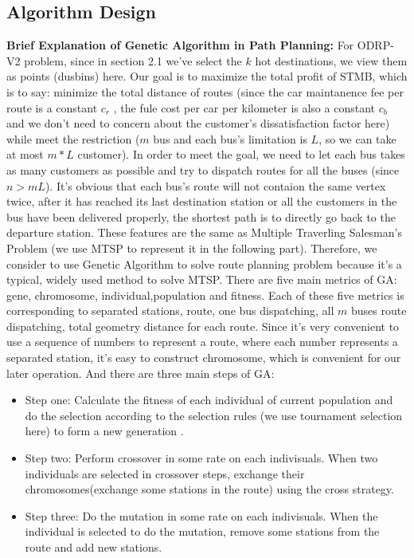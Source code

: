 \documentclass{llncs}
\begin{document}
\subsection{Algorithm Design}
\textbf{Brief Explanation of Genetic Algorithm in Path Planning:} For ODRP-V2 problem, since in section 2.1 we've select the $k$ hot destinations, we view them as points (dusbins) here. Our goal is to maximize the total profit of STMB, which is to say: minimize the total distance of routes (since the car maintanence fee per route is a constant $c_r$ , the fule cost per car per kilometer is also a constant $c_b$ and we don't need to concern about the customer's dissatisfaction factor here) while meet the restriction ($m$ bus and each bus's limitation is $L$, so we can take at most $m*L$ customer). In order to meet the goal, we need to let each bus takes as many customers as possible and try to dispatch routes for all the buses (since $n>mL$). It's obvious that each bus's route will not contaion the same vertex twice, after it has reached its last destination station or all the customers in the bus have been delivered properly, the shortest path is to directly go back to the departure station. These features are the same as Multiple Traverling Salesman's Problem (we use MTSP to represent it in the following part). Therefore, we consider to use Genetic Algorithm to solve route planning problem because it's a typical, widely used method to solve MTSP. There are five main metrics of GA: gene, chromosome, individual,population and fitness. Each of these five metrics is corresponding to separated stations, route, one bus dispatching, all $m$ buses route dispatching, total geometry distance for each route. Since it's very convenient to use a sequence of numbers to represent a route, where each number represents a separated station, it's easy to construct chromosome, which is convenient for our later operation. And there are three main steps of GA:
\begin{itemize}
\item Step one: Calculate the fitness of each individual of current population and do the selection according to the selection rules (we use tournament selection here) to form a new generation .

\item Step two: Perform crossover in some rate on each indivisuals. When two individuals are selected in crossover steps, exchange their chromosomes(exchange some stations in the route) using the cross strategy.

\item Step three: Do the mutation in some rate on each indivisuals. When the individual is selected to do the mutation, remove some stations from the route and add new stations.
\end{itemize}
\end{document}
